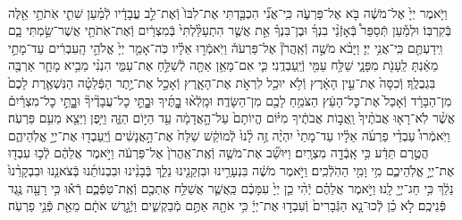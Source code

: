 \documentclass[twoside, openany, parskip=half, 11pt]{book}
\begin{document}
\begin{footnotesize}
\begin{multicols}{2}
\\
וַיֹּ֤אמֶר יְיָ֙ אֶל־מֹשֶׁ֔ה בֹּ֖א אֶל־פַּרְעֹ֑ה כִּֽי־אֲנִ֞י הִכְבַּ֤דְתִּי אֶת־לִבּוֹ֙ וְֿאֶת־לֵ֣ב עֲבָדָ֔יו לְֿמַ֗עַן שִׁתִ֛י אֹֽתֹתַ֥י אֵ֖לֶּה בְּֿקִרְבּֽוֹ׃ וּלְמַ֡עַן תְּֿסַפֵּר֩ בְּֿאָזְֿנֵ֨י בִנְךָ֜ וּבֶן־בִּנְךָ֗ אֵ֣ת אֲשֶׁ֤ר הִתְעַלַּ֨לְתִּי֙ בְּֿמִצְרַ֔יִם וְֿאֶת־אֹֽתֹתַ֖י אֲשֶׁר־שַׂ֣מְתִּי בָ֑ם וִֽידַעְתֶּ֖ם כִּֽי־אֲנִ֥י יְיָ׃ וַיָּבֹ֨א מֹשֶׁ֣ה וְֿאַֽהֲרֹן֘ אֶל־פַּרְעֹה֒ וַיֹּֽאמְֿר֣וּ אֵלָ֗יו כֹּֽה־אָמַ֤ר יְיָ֙ אֱלֹהֵ֣י הָֽעִבְרִ֔ים עַד־מָתַ֣י מֵאַ֔נְתָּ לֵֽעָנֹ֖ת מִפָּנָ֑י שַׁלַּ֥ח עַמִּ֖י וְֿיַֽעַבְדֻֽנִי׃  כִּ֛י אִם־מָאֵ֥ן אַתָּ֖ה לְֿשַׁלֵּ֣חַ אֶת־עַמִּ֑י הִנְנִ֨י מֵבִ֥יא מָחָ֛ר אַרְבֶּ֖ה בִּגְבֻלֶֽךָ׃ וְֿכִסָּה֙ אֶת־עֵ֣ין הָאָ֔רֶץ וְֿלֹ֥א יוּכַ֖ל לִרְאֹ֣ת אֶת־הָאָ֑רֶץ וְֿאָכַ֣ל אֶת־יֶ֣תֶר הַפְּֿלֵטָ֗ה הַנִּשְׁאֶ֤רֶת לָכֶם֙ מִן־הַבָּרָ֔ד וְֿאָכַל֙ אֶת־כׇּל־הָעֵ֔ץ הַצֹּמֵ֥חַ לָכֶ֖ם מִן־הַשָּׂדֶֽה׃ וּמָֽלְֿא֨וּ בׇׇׇׇׇָתֶּ֜יךָ וּבׇׇׇָתֵּ֣י כׇל־עֲבָדֶ֘יךָ֘ וּבׇׇׇָתֵּ֣י כׇל־מִצְרַ֒יִם֒ אֲשֶׁ֨ר לֹֽא־רָא֤וּ אֲבֹתֶ֨יךָ֙ וַֽאֲב֣וֹת אֲבֹתֶ֔יךָ מִיּ֗וֹם הֱיוֹתָם֙ עַל־הָ֣אֲדָמָ֔ה עַ֖ד הַיּ֣וֹם הַזֶּ֑ה וַיִּ֥פֶן וַיֵּצֵ֖א מֵעִ֥ם פַּרְעֹֽה׃  וַיֹּֽאמְֿרוּ֩ עַבְדֵ֨י פַרְעֹ֜ה אֵלָ֗יו עַד־מָתַי֙ יִהְיֶ֨ה זֶ֥ה לָ֨נוּ֙ לְֿמוֹקֵ֔שׁ שַׁלַּח֙ אֶת־הָ֣אֲנָשִׁ֔ים וְֿיַֽעַבְד֖וּ אֶת־יְיָ֣ אֱלֹֽהֵיהֶ֑ם הֲטֶ֣רֶם תֵּדַ֔ע כִּ֥י אָֽבְֿדָ֖ה מִצְרָֽיִם׃ וַיּוּשַׁ֞ב אֶת־מֹשֶׁ֤ה וְֿאֶֽת־אַֽהֲרֹן֙ אֶל־פַּרְעֹ֔ה וַיֹּ֣אמֶר אֲלֵהֶ֔ם לְֿכ֥וּ עִבְד֖וּ אֶת־יְיָ֣ אֱלֹֽהֵיכֶ֑ם מִ֥י וָמִ֖י הַהֹֽלְֿכִֽים׃ וַיֹּ֣אמֶר מֹשֶׁ֔ה בִּנְעָרֵ֥ינוּ וּבִזְקֵנֵ֖ינוּ נֵלֵ֑ךְ בְּֿבָנֵ֨ינוּ וּבִבְנוֹתֵ֜נוּ בְּֿצֹאנֵ֤נוּ וּבִבְקָרֵ֨נוּ֙ נֵלֵ֔ךְ כִּ֥י חַג־יְיָ֖ לָֽנוּ׃ וַיֹּ֣אמֶר אֲלֵהֶ֗ם יְֿהִ֨י כֵ֤ן יְיָ֙ עִמָּכֶ֔ם כַּֽאֲשֶׁ֛ר אֲשַׁלַּ֥ח אֶתְכֶ֖ם וְֿאֶֽת־טַפְּֿכֶ֑ם רְֿא֕וּ כִּ֥י רָעָ֖ה נֶ֥גֶד פְּֿנֵיכֶֽם׃ לֹ֣א כֵ֗ן לְֿכוּ־נָ֤א הַגְּֿבָרִים֙ וְֿעִבְד֣וּ אֶת־יְיָ֔ כִּ֥י אֹתָ֖הּ אַתֶּ֣ם מְֿבַקְשִׁ֑ים וַיְֿגָ֣רֶשׁ אֹתָ֔ם מֵאֵ֖ת פְּֿנֵ֥י פַרְעֹֽה׃



\end{multicols}
\end{footnotesize}
\end{document}
